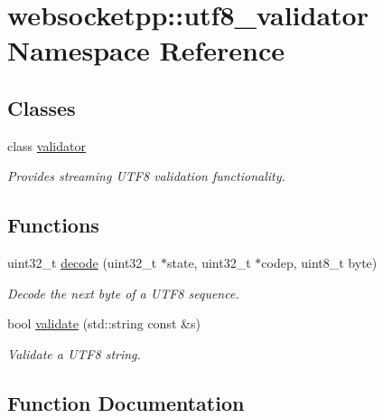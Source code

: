 \hypertarget{namespacewebsocketpp_1_1utf8__validator}{}\section{websocketpp\+:\+:utf8\+\_\+validator Namespace Reference}
\label{namespacewebsocketpp_1_1utf8__validator}
\subsection*{Classes}
\begin{DoxyCompactItemize}
\item 
class \hyperlink{classwebsocketpp_1_1utf8__validator_1_1validator}{validator}
\begin{DoxyCompactList}\small\item\em Provides streaming U\+T\+F8 validation functionality. \end{DoxyCompactList}\end{DoxyCompactItemize}
\subsection*{Functions}
\begin{DoxyCompactItemize}
\item 
uint32\+\_\+t \hyperlink{namespacewebsocketpp_1_1utf8__validator_ae6dab1acad72af0396e2448394a07d98}{decode} (uint32\+\_\+t $\ast$state, uint32\+\_\+t $\ast$codep, uint8\+\_\+t byte)
\begin{DoxyCompactList}\small\item\em Decode the next byte of a U\+T\+F8 sequence. \end{DoxyCompactList}\item 
bool \hyperlink{namespacewebsocketpp_1_1utf8__validator_ad088137c6f18e6844e20496d8782c835}{validate} (std\+::string const \&s)
\begin{DoxyCompactList}\small\item\em Validate a U\+T\+F8 string. \end{DoxyCompactList}\end{DoxyCompactItemize}


\subsection{Function Documentation}
\hypertarget{namespacewebsocketpp_1_1utf8__validator_ae6dab1acad72af0396e2448394a07d98}{}
